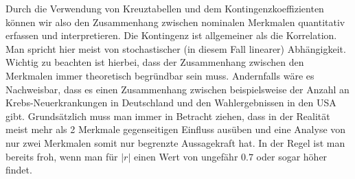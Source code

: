 Durch die Verwendung von Kreuztabellen und dem Kontingenzkoeffizienten können wir also den Zusammenhang zwischen nominalen Merkmalen quantitativ erfassen und interpretieren.
\newline
Die Kontingenz ist allgemeiner als die Korrelation.
Man spricht hier meist von stochastischer (in diesem Fall linearer) Abhängigkeit.
Wichtig zu beachten ist hierbei, dass der Zusammenhang zwischen den Merkmalen immer theoretisch begründbar sein muss.
Andernfalls wäre es Nachweisbar, dass es einen Zusammenhang zwischen beispielsweise der Anzahl an Krebs-Neuerkrankungen in Deutschland und den Wahlergebnissen in den USA gibt.
\newline
Grundsätzlich muss man immer in Betracht ziehen, dass in der Realität meist mehr als 2 Merkmale gegenseitigen Einfluss ausüben und eine Analyse von nur zwei Merkmalen somit nur begrenzte Aussagekraft hat.
In der Regel ist man bereits froh, wenn man für $|r|$ einen Wert von ungefähr $0.7$ oder sogar höher findet.